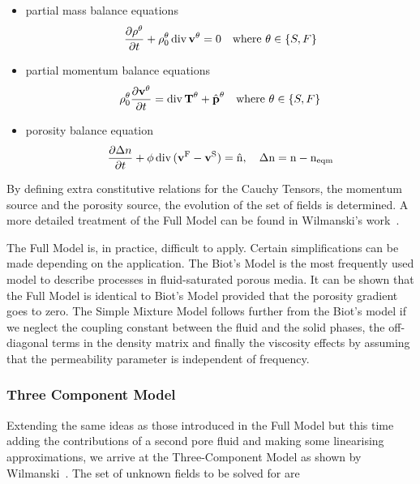 \documentclass[twocolumn]{article}
\begin{document}
\begin{itemize}
    \item partial mass balance equations
          \begin{equation}
              \frac{\partial{\rho^\theta}}{\partial{t}} +
              \rho_0^\theta\,\rm{div}\,{\textbf{v}^\theta} = 0 \quad\text{where $\theta \in \{S, F\}$}
          \end{equation}
    \item partial momentum balance equations
          \begin{equation}
              \rho_0^\theta\frac{\partial{\textbf{v}^\theta}}{\partial{t}} = \rm{div}\,\textbf{T}^\theta + \hat{\textbf{p}}^\theta \quad\text{where $\theta \in \{S, F\}$}
          \end{equation}
    \item porosity balance equation
          \begin{equation}
              \frac{\partial \Delta{n}}{\partial t} + \phi\,\rm{div}\,(\textbf{v}^F - \textbf{v}^S) = \hat{n},
              \quad \Delta{n} = n - n_{eqm}
          \end{equation}
\end{itemize}

By defining extra constitutive relations for the Cauchy Tensors, the momentum source and the porosity source, the evolution of the set of fields is determined. A more detailed treatment of the Full Model can be found in Wilmanski’s work~\cite{wilmanski_2002}.

The Full Model is, in practice, difficult to apply. Certain simplifications can be made depending on the application. The Biot’s Model is the most frequently used model to describe processes in fluid-saturated porous media. It can be shown that the Full Model is identical to Biot’s Model provided that the porosity gradient goes to zero. The Simple Mixture Model follows further from the Biot’s model if we neglect the coupling constant between the fluid and the solid phases, the off-diagonal terms in the density matrix and finally the viscosity effects by assuming that the permeability parameter is independent of frequency.

\subsubsection{Three Component Model}
Extending the same ideas as those introduced in the Full Model but this time adding the contributions of a second pore fluid and making some linearising approximations, we arrive at the Three-Component Model as shown by Wilmanski~\cite{wilmanski_2002}. The set of unknown fields to be solved for are
\end{document}
